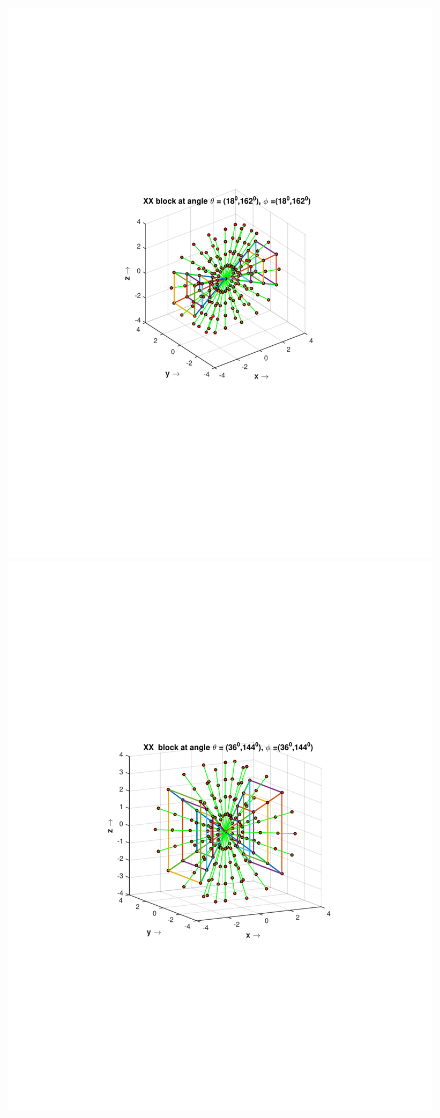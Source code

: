 \documentclass{UCF_ETD}
\begin{document}
 
 \begin{figure}[H]
 \begin{center}
 \includegraphics[scale=0.53]{PolarSphericalDFT/XXBlockLevel1}
 \includegraphics[scale=0.53]{PolarSphericalDFT/XXBlockLevel22}

\end{center}
\end{figure}
\end{document}
